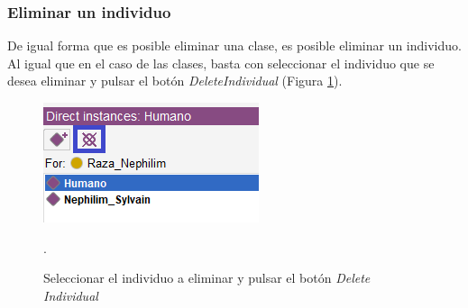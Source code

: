 \subsubsection{Eliminar un individuo}
De igual forma que es posible eliminar una clase, es posible eliminar un individuo. Al igual que en el caso de las clases, 
basta con seleccionar el individuo que se desea eliminar y pulsar el botón \textit{DeleteIndividual} (Figura \ref*{DeleteIndividual}).

\begin{figure}[H]
    \centering
    \includegraphics[scale=0.6]{Figures/Protege/DeleteIndividual.png}
    \caption{Seleccionar el individuo a eliminar y pulsar el botón \textit{Delete Individual}}.
    \label{DeleteIndividual}
\end{figure}
